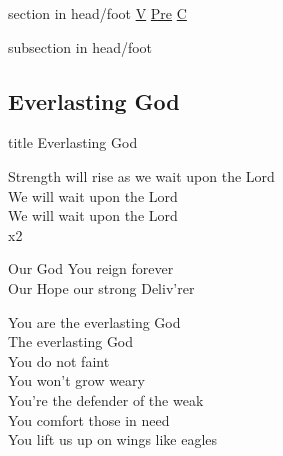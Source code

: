 \documentclass{beamer}
\begin{document}
{
{ 
 {
 \begin{beamercolorbox}[ht=4.5ex,dp=1.5ex,%
      leftskip=.3cm,rightskip=.3cm plus1fil]{section in head/foot}
 \fontsize{12}{25}\selectfont 
\hyperlink{Everlasting God['Strength will rise']V}{V}
\hyperlink{Everlasting God['Strength will rise']Pre}{Pre}
\hyperlink{Everlasting God['Strength will rise']C}{C}
 
 \end{beamercolorbox}%
  \begin{beamercolorbox}[ht=2.5ex,dp=1.125ex,%
   leftskip=.3cm,rightskip=.3cm plus1fil]{subsection in head/foot}
   \insertauthor
 \end{beamercolorbox}%
 }
}
\subsection{ Everlasting God }

\hypertarget{Everlasting God['Strength will rise']}{}
\begin{frame}{}
 \vfill
  \centering
  \begin{beamercolorbox}[sep=8pt,center,shadow=true,rounded=true]{title}
    Everlasting God     
  \end{beamercolorbox}
  \vfill
\end{frame}

\hypertarget{Everlasting God['Strength will rise']V}{}
\begin{frame}{}
\fontsize{ 18 }{ 23 }\selectfont

Strength will rise as we wait upon the Lord\\ 
We will wait upon the Lord\\ 
We will wait upon the Lord\\ 
x2 

\end{frame}

\hypertarget{Everlasting God['Strength will rise']Pre}{}
\begin{frame}{}
\fontsize{ 18 }{ 23 }\selectfont

Our God You reign forever\\ 
Our Hope our strong Deliv'rer 

\end{frame}

\hypertarget{Everlasting God['Strength will rise']C}{}
\begin{frame}{}
\fontsize{ 18 }{ 23 }\selectfont

You are the everlasting God\\ 
The everlasting God\\ 
You do not faint\\ 
You won't grow weary\\ 
You're the defender of the weak\\ 
You comfort those in need\\ 
You lift us up on wings like eagles 

\end{frame}

}
\end{document}
